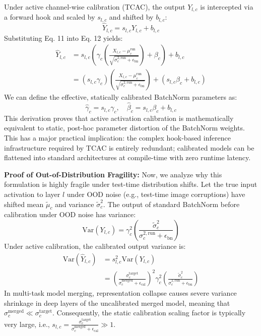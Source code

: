 \documentclass{article}
\begin{document}
Under active channel-wise calibration (TCAC), the output $Y_{l,c}$ is intercepted via a forward hook and scaled by $s_{l,c}$ and shifted by $b_{l,c}$:
\begin{equation}
    \hat{Y}_{l,c} = s_{l,c} Y_{l,c} + b_{l,c}
\end{equation}
Substituting Eq. 11 into Eq. 12 yields:
\begin{align}
    \hat{Y}_{l,c} &= s_{l,c} \left( \gamma_c \left( \frac{X_{l,c} - \mu^{\mathrm{run}}_c}{\sqrt{\sigma^{2,\mathrm{run}}_c + \epsilon_{\mathrm{bn}}}} \right) + \beta_c \right) + b_{l,c} \\
    &= (s_{l,c} \gamma_c) \left( \frac{X_{l,c} - \mu^{\mathrm{run}}_c}{\sqrt{\sigma^{2,\mathrm{run}}_c + \epsilon_{\mathrm{bn}}}} \right) + (s_{l,c} \beta_c + b_{l,c})
\end{align}
We can define the effective, statically calibrated BatchNorm parameters as:
\begin{equation}
    \hat{\gamma}_c = s_{l,c} \gamma_c, \quad \hat{\beta}_c = s_{l,c} \beta_c + b_{l,c}
\end{equation}
This derivation proves that active activation calibration is mathematically equivalent to static, post-hoc parameter distortion of the BatchNorm weights. This has a major practical implication: the complex hook-based inference infrastructure required by TCAC is entirely redundant; calibrated models can be flattened into standard architectures at compile-time with zero runtime latency.

\textbf{Proof of Out-of-Distribution Fragility:}
Now, we analyze why this formulation is highly fragile under test-time distribution shifts. Let the true input activation to layer $l$ under OOD noise (e.g., test-time image corruptions) have shifted mean $\tilde{\mu}_c$ and variance $\tilde{\sigma}^2_c$.
The output of standard BatchNorm before calibration under OOD noise has variance:
\begin{equation}
    \mathrm{Var}(Y_{l,c}) = \gamma_c^2 \left( \frac{\tilde{\sigma}^2_c}{\sigma^{2,\mathrm{run}}_c + \epsilon_{\mathrm{bn}}} \right)
\end{equation}
Under active calibration, the calibrated output variance is:
\begin{align}
    \mathrm{Var}(\hat{Y}_{l,c}) &= s_{l,c}^2 \mathrm{Var}(Y_{l,c}) \\
    &= \left( \frac{\sigma^{\mathrm{target}}_c}{\sigma^{\mathrm{merged}}_c + \epsilon_{\mathrm{cal}}} \right)^2 \gamma_c^2 \left( \frac{\tilde{\sigma}^2_c}{\sigma^{2,\mathrm{run}}_c + \epsilon_{\mathrm{bn}}} \right)
\end{align}
In multi-task model merging, representation collapse causes severe variance shrinkage in deep layers of the uncalibrated merged model, meaning that $\sigma^{\mathrm{merged}}_c \ll \sigma^{\mathrm{target}}_c$. Consequently, the static calibration scaling factor is typically very large, i.e., $s_{l,c} = \frac{\sigma^{\mathrm{target}}_c}{\sigma^{\mathrm{merged}}_c + \epsilon_{\mathrm{cal}}} \gg 1$.
\end{document}
